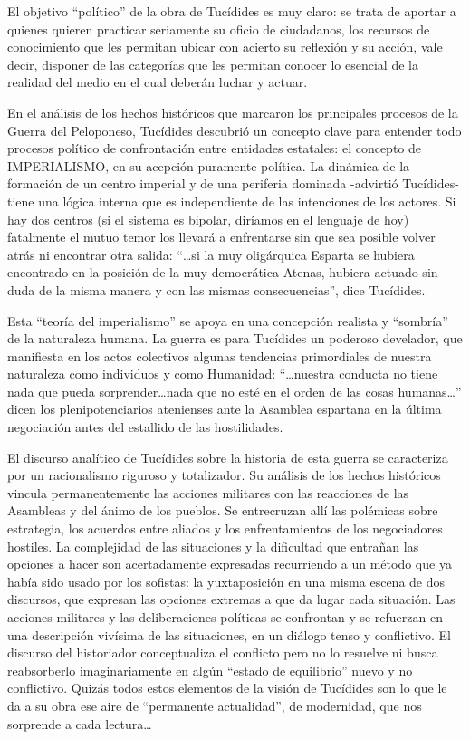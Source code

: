 \documentclass[
]{book}
\begin{document}
El objetivo ``político'' de la obra de Tucídides es muy claro: se trata de aportar a quienes quieren practicar seriamente su oficio de ciudadanos, los recursos de conocimiento que les permitan ubicar con acierto su reflexión y su acción, vale decir, disponer de las categorías que les permitan conocer lo esencial de la realidad del medio en el cual deberán luchar y actuar.

En el análisis de los hechos históricos que marcaron los principales procesos de la Guerra del Peloponeso, Tucídides descubrió un concepto clave para entender todo procesos político de confrontación entre entidades estatales: el concepto de IMPERIALISMO, en su acepción puramente política. La dinámica de la formación de un centro imperial y de una periferia dominada -advirtió Tucídides- tiene una lógica interna que es independiente de las intenciones de los actores. Si hay dos centros (si el sistema es bipolar, diríamos en el lenguaje de hoy) fatalmente el mutuo temor los llevará a enfrentarse sin que sea posible volver atrás ni encontrar otra salida: ``\ldots si la muy oligárquica Esparta se hubiera encontrado en la posición de la muy democrática Atenas, hubiera actuado sin duda de la misma manera y con las mismas consecuencias'', dice Tucídides.

Esta ``teoría del imperialismo'' se apoya en una concepción realista y ``sombría'' de la naturaleza humana. La guerra es para Tucídides un poderoso develador, que manifiesta en los actos colectivos algunas tendencias primordiales de nuestra naturaleza como individuos y como Humanidad: ``\ldots nuestra conducta no tiene nada que pueda sorprender\ldots nada que no esté en el orden de las cosas humanas\ldots{}'' dicen los plenipotenciarios atenienses ante la Asamblea espartana en la última negociación antes del estallido de las hostilidades.

El discurso analítico de Tucídides sobre la historia de esta guerra se caracteriza por un racionalismo riguroso y totalizador. Su análisis de los hechos históricos vincula permanentemente las acciones militares con las reacciones de las Asambleas y del ánimo de los pueblos. Se entrecruzan allí las polémicas sobre estrategia, los acuerdos entre aliados y los enfrentamientos de los negociadores hostiles. La complejidad de las situaciones y la dificultad que entrañan las opciones a hacer son acertadamente expresadas recurriendo a un método que ya había sido usado por los sofistas: la yuxtaposición en una misma escena de dos discursos, que expresan las opciones extremas a que da lugar cada situación. Las acciones militares y las deliberaciones políticas se confrontan y se refuerzan en una descripción vivísima de las situaciones, en un diálogo tenso y conflictivo. El discurso del historiador conceptualiza el conflicto pero no lo resuelve ni busca reabsorberlo imaginariamente en algún ``estado de equilibrio'' nuevo y no conflictivo. Quizás todos estos elementos de la visión de Tucídides son lo que le da a su obra ese aire de ``permanente actualidad'', de modernidad, que nos sorprende a cada lectura\ldots{}
\end{document}
